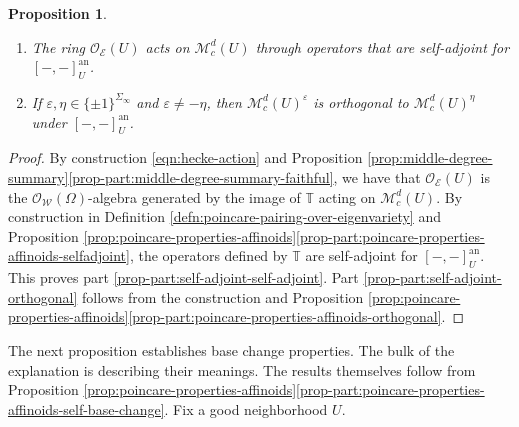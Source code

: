\documentclass[10pt, twoside]{amsart}
\theoremstyle{plain}
\newtheorem{proposition}[theorem]{Proposition}
\theoremstyle{definition}
\theoremstyle{remark}
\numberwithin{equation}{subsection}
\def\T{\mathbb{T}}
\def\an{\mathrm{an}}
\def\scro{\mathscr O}
\def\scre{\mathscr E}
\def\scro{\mathscr O}
\def\scrw{\mathscr W}
\def\scrm{\mathscr{M}}
\begin{document}
\begin{proposition}\label{prop:self-adjoint}
\leavevmode
\begin{enumerate}[label=(\roman*)]
\item The ring $\scro_{\scre}(U)$ acts on $\scrm_c^d(U)$ through operators that are self-adjoint for $[-,-]_U^{\an}$.\label{prop-part:self-adjoint-self-adjoint}
\item If $\varepsilon,\eta \in \{\pm 1\}^{\Sigma_\infty}$ and $\varepsilon \neq -\eta$, then $\scrm_c^d(U)^{\varepsilon}$ is orthogonal to $\scrm_c^d(U)^{\eta}$ under $[-,-]_U^{\an}$.\label{prop-part:self-adjoint-orthogonal}
\end{enumerate}
\end{proposition}
\begin{proof}
By construction \eqref{eqn:hecke-action} and Proposition \ref{prop:middle-degree-summary}\ref{prop-part:middle-degree-summary-faithful}, we have that $\scro_{\scre}(U)$ is the $\scro_{\scrw}(\Omega)$-algebra generated by the image of $\T$ acting on $\scrm^d_c(U)$. By construction in Definition \ref{defn:poincare-pairing-over-eigenvariety} and Proposition \ref{prop:poincare-properties-affinoids}\ref{prop-part:poincare-properties-affinoids-selfadjoint}, the operators defined by $\T$ are self-adjoint for $[-,-]_U^{\an}$. This proves part \ref{prop-part:self-adjoint-self-adjoint}. Part \ref{prop-part:self-adjoint-orthogonal} follows from the construction and Proposition \ref{prop:poincare-properties-affinoids}\ref{prop-part:poincare-properties-affinoids-orthogonal}.
\end{proof}

The next proposition establishes base change properties. The bulk of the explanation is describing their meanings. The results themselves follow from Proposition \ref{prop:poincare-properties-affinoids}\ref{prop-part:poincare-properties-affinoids-self-base-change}. Fix a good neighborhood $U$. 
\end{document}
